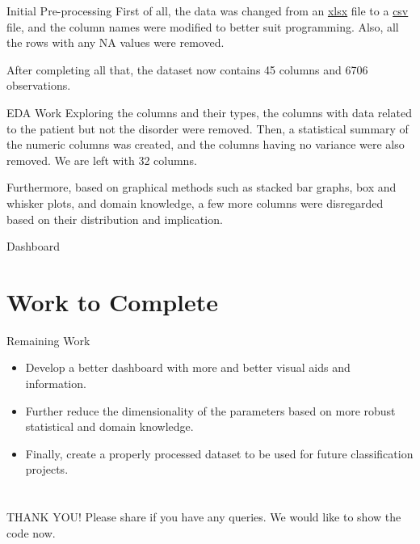 \documentclass{beamer}
\begin{document}
	\begin{frame}{Initial Pre-processing}
		First of all, the data was changed from an \underline{xlsx} file to a \underline{csv} file, and the column names were modified to better suit programming. Also, all the rows with any NA values were removed.
		
		After completing all that, the dataset now contains 45 columns and 6706 observations.
	\end{frame}
	
	\begin{frame}{EDA Work}
		Exploring the columns and their types, the columns with data related to the patient but not the disorder were removed. Then, a statistical summary of the numeric columns was created, and the columns having no variance were also removed. We are left with 32 columns.
		
		Furthermore, based on graphical methods such as stacked bar graphs, box and whisker plots, and domain knowledge, a few more columns were disregarded based on their distribution and implication.
	\end{frame}
	
	\begin{frame}{Dashboard}
	\end{frame}
	
	\section{Work to Complete}
	\begin{frame}{Remaining Work}
		\begin{itemize}
			\item Develop a better dashboard with more and better visual aids and information.
			
			\item Further reduce the dimensionality of the parameters based on more robust statistical and domain knowledge.
			
			\item Finally, create a properly processed dataset to be used for future classification projects.
		\end{itemize}
	\end{frame}
	
	
	\section*{}
	\begin{frame}
		\begin{center}
			{\Huge THANK YOU!} \newline \newline
		Please share if you have any queries.\newline
		We would like to show the code now.
		
	\end{center}
	\end{frame}
	
\end{document}
